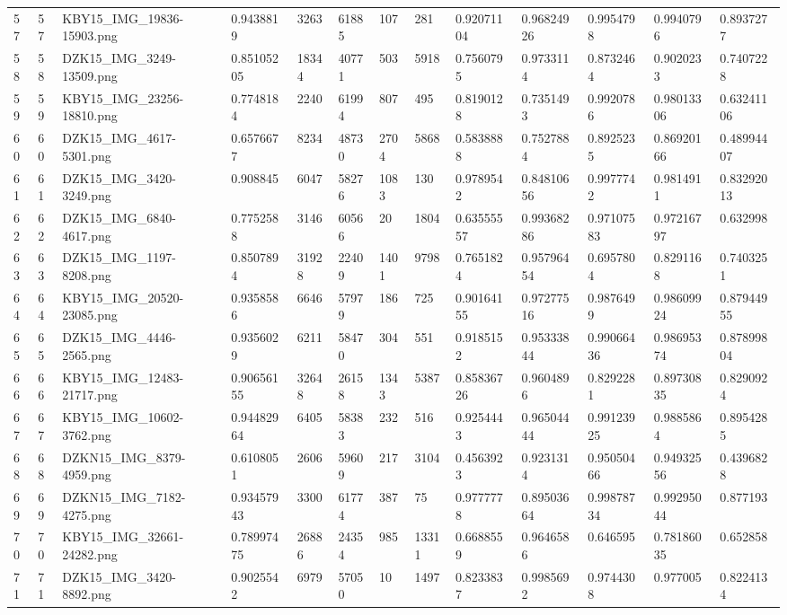 \documentclass[11pt, a4paper, twoside]{report}
\begin{document}
\begin{longtable}[c]{@{}lllllllllllll@{}}
57 & 57 & KBY15\_IMG\_19836-15903.png & 0.9438819 & 3263 & 61885 & 107 & 281 & 0.92071104 & 0.96824926 & 0.9954798 & 0.9940796 & 0.8937277 \\
58 & 58 & DZK15\_IMG\_3249-13509.png & 0.85105205 & 18344 & 40771 & 503 & 5918 & 0.7560795 & 0.9733114 & 0.8732464 & 0.9020233 & 0.7407228 \\
59 & 59 & KBY15\_IMG\_23256-18810.png & 0.7748184 & 2240 & 61994 & 807 & 495 & 0.8190128 & 0.7351493 & 0.9920786 & 0.98013306 & 0.63241106 \\
60 & 60 & DZK15\_IMG\_4617-5301.png & 0.6576677 & 8234 & 48730 & 2704 & 5868 & 0.5838888 & 0.7527884 & 0.8925235 & 0.86920166 & 0.48994407 \\
61 & 61 & DZK15\_IMG\_3420-3249.png & 0.908845 & 6047 & 58276 & 1083 & 130 & 0.9789542 & 0.84810656 & 0.9977742 & 0.9814911 & 0.83292013 \\
62 & 62 & DZK15\_IMG\_6840-4617.png & 0.7752588 & 3146 & 60566 & 20 & 1804 & 0.63555557 & 0.99368286 & 0.97107583 & 0.97216797 & 0.632998 \\
63 & 63 & DZK15\_IMG\_1197-8208.png & 0.8507894 & 31928 & 22409 & 1401 & 9798 & 0.7651824 & 0.95796454 & 0.6957804 & 0.8291168 & 0.7403251 \\
64 & 64 & KBY15\_IMG\_20520-23085.png & 0.9358586 & 6646 & 57979 & 186 & 725 & 0.90164155 & 0.97277516 & 0.9876499 & 0.98609924 & 0.87944955 \\
65 & 65 & DZK15\_IMG\_4446-2565.png & 0.9356029 & 6211 & 58470 & 304 & 551 & 0.9185152 & 0.95333844 & 0.99066436 & 0.98695374 & 0.87899804 \\
66 & 66 & KBY15\_IMG\_12483-21717.png & 0.90656155 & 32648 & 26158 & 1343 & 5387 & 0.85836726 & 0.9604896 & 0.8292281 & 0.89730835 & 0.8290924 \\
67 & 67 & KBY15\_IMG\_10602-3762.png & 0.94482964 & 6405 & 58383 & 232 & 516 & 0.9254443 & 0.96504444 & 0.99123925 & 0.9885864 & 0.8954285 \\
68 & 68 & DZKN15\_IMG\_8379-4959.png & 0.6108051 & 2606 & 59609 & 217 & 3104 & 0.4563923 & 0.9231314 & 0.95050466 & 0.94932556 & 0.4396828 \\
69 & 69 & DZKN15\_IMG\_7182-4275.png & 0.93457943 & 3300 & 61774 & 387 & 75 & 0.9777778 & 0.89503664 & 0.99878734 & 0.99295044 & 0.877193 \\
70 & 70 & KBY15\_IMG\_32661-24282.png & 0.78997475 & 26886 & 24354 & 985 & 13311 & 0.6688559 & 0.9646586 & 0.646595 & 0.78186035 & 0.652858 \\
71 & 71 & DZK15\_IMG\_3420-8892.png & 0.9025542 & 6979 & 57050 & 10 & 1497 & 0.8233837 & 0.9985692 & 0.9744308 & 0.977005 & 0.8224134 \\

\end{longtable}
\end{document}
